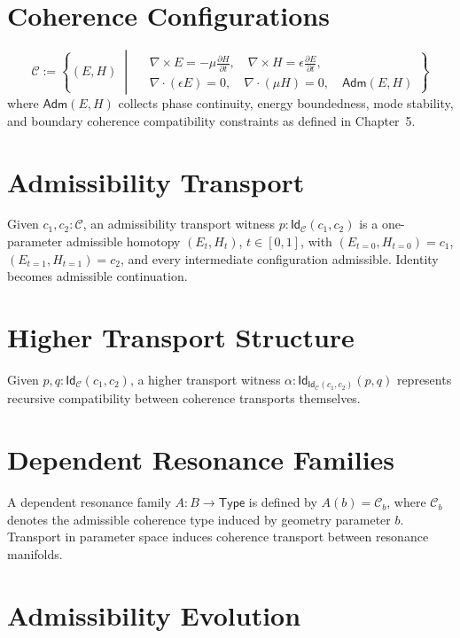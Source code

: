 \documentclass[11pt,openany]{book}
\theoremstyle{definition}
\theoremstyle{plain}
\newcommand{\Type}{\mathsf{Type}}
\newcommand{\idtype}{\mathsf{Id}}
\begin{document}
\section{Coherence Configurations}

\[
\mathcal{C}
:=
\left\{
(E,H)
\;\middle|\;
\begin{aligned}
&\nabla \times E = -\mu \tfrac{\partial H}{\partial t},\quad
\nabla \times H = \epsilon \tfrac{\partial E}{\partial t},\\
&\nabla \cdot (\epsilon E)=0,\quad
\nabla \cdot (\mu H)=0,\quad
\mathsf{Adm}(E,H)
\end{aligned}
\right\}
\]
where $\mathsf{Adm}(E,H)$ collects phase continuity, energy boundedness, mode stability, and boundary coherence compatibility constraints as defined in Chapter~5.

\section{Admissibility Transport}

Given $c_1, c_2 : \mathcal{C}$, an admissibility transport witness $p : \idtype_{\mathcal{C}}(c_1,c_2)$ is a one-parameter admissible homotopy $(E_t,H_t)$, $t \in [0,1]$, with $(E_{t=0},H_{t=0}) = c_1$, $(E_{t=1},H_{t=1}) = c_2$, and every intermediate configuration admissible. Identity becomes admissible continuation.

\section{Higher Transport Structure}

Given $p,q : \idtype_{\mathcal{C}}(c_1,c_2)$, a higher transport witness $\alpha : \idtype_{\idtype_{\mathcal{C}}(c_1,c_2)}(p,q)$ represents recursive compatibility between coherence transports themselves.

\section{Dependent Resonance Families}

A dependent resonance family $A : B \to \Type$ is defined by $A(b) = \mathcal{C}_b$, where $\mathcal{C}_b$ denotes the admissible coherence type induced by geometry parameter $b$. Transport in parameter space induces coherence transport between resonance manifolds.

\section{Admissibility Evolution}
\end{document}
